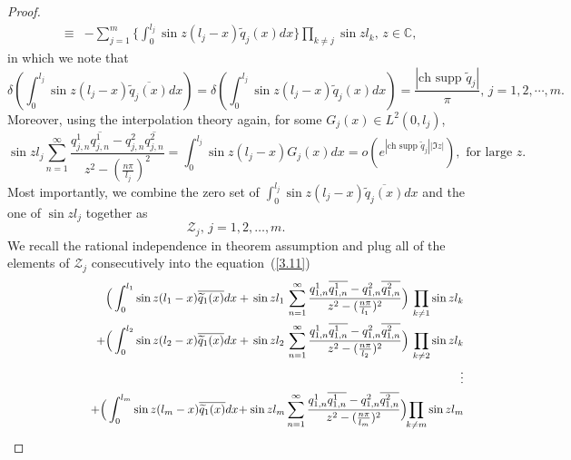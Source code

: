 \documentclass[10pt,a4paper]{article}
\theoremstyle{plain}
\theoremstyle{definition}
\theoremstyle{remark}
\numberwithin{equation}{section}
\begin{document}
\begin{proof}
\begin{eqnarray}
&\equiv&-\sum_{j=1}^{m}\Big\{\int_{0}^{l_{j}}\sin{z(l_{j}-x)}\widetilde{q}_{j}(x)dx\Big\}\prod_{k\neq j}\sin{z l_{k}},\,z\in\mathbb{C},\label{3.11}
\end{eqnarray}
in which we note that $$\delta(\int_{0}^{l_{j}}\sin{z(l_{j}-x)}\overline{\widetilde{q}_{j}(x)}dx)=\delta(\int_{0}^{l_{j}}\sin{z(l_{j}-x)}\widetilde{q}_{j}(x)dx)=\frac{|\mbox{ch supp } \widetilde{q}_{j}|}{\pi},\,j=1,2,\cdots,m.$$
Moreover, using the interpolation theory again, for some $G_{j}(x)\in L^{2}(0,l_{j})$,
\begin{equation}
\sin{z l_{j}}\sum_{n=1}^{\infty}\frac{q^{1}_{j,n}\overline{q^{1}_{j,n}}-q^{2}_{j,n}\overline{q^{2}_{j,n}}}{z^{2}-(\frac{n\pi}{l_{j}})^{2}}=\int_{0}^{l_{j}}\sin{z(l_{j}-x)}G_{j}(x)dx=o(e^{|\mbox{ch supp } \widetilde{q}_{j}||\Im z|}), \mbox{ for large }z.\label{312}
\end{equation}
Most importantly, we combine the zero set of $\int_{0}^{l_{j}}\sin{z(l_{j}-x)}\overline{\widetilde{q}_{j}(x)}dx$ and the one of $\sin{z l_{j}}$ together  as
\begin{equation}
\mathcal{Z}_{j},\,j=1,2,\ldots,m.
\end{equation}
We recall the rational independence in theorem assumption and plug all of the elements of $\mathcal{Z}_{j}$ consecutively into the equation~(\ref{3.11})
\begin{eqnarray}\nonumber
&&\hspace{8pt}\Big(\int_{0}^{l_{1}}\sin{z(l_{1}-x)}\overline{\widetilde{q}_{1}(x)}dx+\,\sin{z l_{1}}\,\sum_{n=1}^{\infty}\frac{q^{1}_{1,n}\overline{q^{1}_{1,n}}-q^{2}_{1,n}\overline{q^{2}_{1,n}}}{z^{2}-(\frac{n\pi}{l_{1}})^{2}}\Big)\,\prod_{k\neq 1}\sin{z l_{k}}\\\nonumber
&&+\Big(\int_{0}^{l_{2}}\sin{z(l_{2}-x)}\overline{\widetilde{q}_{1}(x)}dx+\,\sin{z l_{2}}\,\sum_{n=1}^{\infty}\frac{q^{1}_{1,n}\overline{q^{1}_{1,n}}-q^{2}_{1,n}\overline{q^{2}_{1,n}}}{z^{2}-(\frac{n\pi}{l_{2}})^{2}}\Big)\,\prod_{k\neq 2}\sin{z l_{k}}\\\nonumber
&&\hspace{80pt}\vdots\\\nonumber\hspace{60pt}
&&+\Big(\int_{0}^{l_{m}}\sin{z(l_{m}-x)}\overline{\widetilde{q}_{1}(x)}dx\hspace{-2pt}+\sin{z l_{m}}\sum_{n=1}^{\infty}\frac{q^{1}_{1,n}\overline{q^{1}_{1,n}}-q^{2}_{1,n}\overline{q^{2}_{1,n}}}{z^{2}-(\frac{n\pi}{l_{m}})^{2}}\Big)\hspace{-3pt}\prod_{k\neq m}\sin{z l_{m}}\\

\end{eqnarray}
\end{proof}
\end{document}
